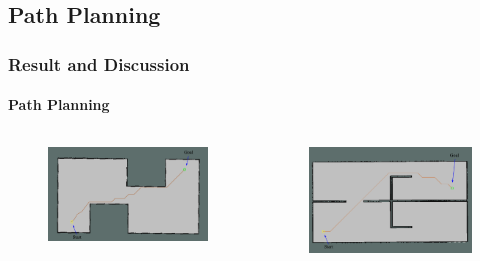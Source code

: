 \begin{frame}
	\subsection{Path Planning}
	\frametitle{Result and Discussion}
	\framesubtitle{Path Planning}
	\begin{columns}
		\begin{figure}[h]
			\includegraphics[scale=0.5]{image/pp_map1.pdf}
		\end{figure}
		
		\begin{figure}[h]
			\includegraphics[scale=0.5]{image/pp_map2.pdf}
		\end{figure}
	\end{columns}
\end{frame}


